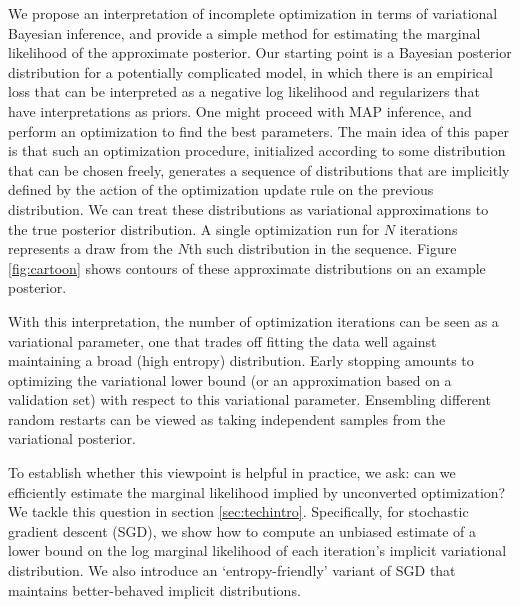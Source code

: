 \documentclass[]{article}
\begin{document}
We propose an interpretation of incomplete optimization in terms of variational Bayesian inference, and provide a simple method for estimating the marginal likelihood of the approximate posterior.
Our starting point is a Bayesian posterior distribution for a potentially complicated model, in which there is an empirical loss that can be interpreted as a negative log likelihood and regularizers that have interpretations as priors.
One might proceed with MAP inference, and perform an optimization to find the best parameters.
The main idea of this paper is that such an optimization procedure, initialized according to some distribution that can be chosen freely, generates a sequence of distributions that are implicitly defined by the action of the optimization update rule on the previous distribution.
We can treat these distributions as variational approximations to the true posterior distribution.
A single optimization run for $N$ iterations represents a draw from the $N$th such distribution in the sequence.
Figure \ref{fig:cartoon} shows contours of these approximate distributions on an example posterior.

With this interpretation, the number of optimization iterations can be seen as a variational parameter, one that trades off fitting the data well against maintaining a broad (high entropy) distribution.
Early stopping amounts to optimizing the variational lower bound (or an approximation based on a validation set) with respect to this variational parameter.
Ensembling different random restarts can be viewed as taking independent samples from the variational posterior.

To establish whether this viewpoint is helpful in practice, we ask: can we efficiently estimate the marginal likelihood implied by unconverted optimization?
We tackle this question in section \ref{sec:techintro}.
Specifically, for stochastic gradient descent (SGD), we show how to compute an unbiased estimate of a lower bound on the log marginal likelihood of each iteration's implicit variational distribution.
We also introduce an `entropy-friendly' variant of SGD that maintains better-behaved implicit distributions.
\end{document}
